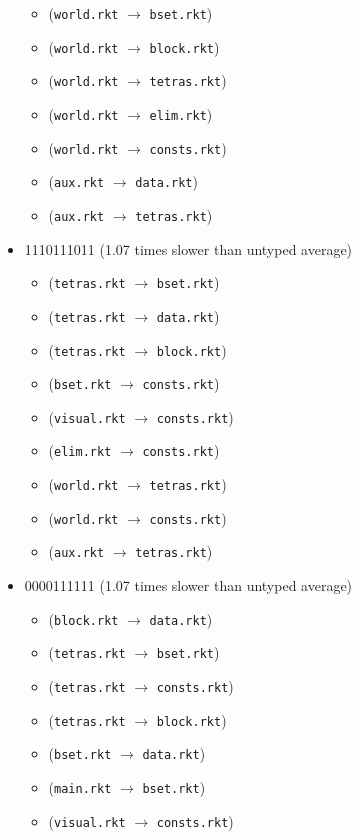\documentclass{article}
\newcommand{\mono}[1]{\texttt{#1}}
\begin{document}
\begin{itemize}
\begin{itemize}
  \item (\mono{world.rkt} $\rightarrow$ \mono{bset.rkt})
  \item (\mono{world.rkt} $\rightarrow$ \mono{block.rkt})
  \item (\mono{world.rkt} $\rightarrow$ \mono{tetras.rkt})
  \item (\mono{world.rkt} $\rightarrow$ \mono{elim.rkt})
  \item (\mono{world.rkt} $\rightarrow$ \mono{consts.rkt})
  \item (\mono{aux.rkt} $\rightarrow$ \mono{data.rkt})
  \item (\mono{aux.rkt} $\rightarrow$ \mono{tetras.rkt})
  \end{itemize}
\item 1110111011 (1.07 times slower than untyped average)
  \begin{itemize}
  \item (\mono{tetras.rkt} $\rightarrow$ \mono{bset.rkt})
  \item (\mono{tetras.rkt} $\rightarrow$ \mono{data.rkt})
  \item (\mono{tetras.rkt} $\rightarrow$ \mono{block.rkt})
  \item (\mono{bset.rkt} $\rightarrow$ \mono{consts.rkt})
  \item (\mono{visual.rkt} $\rightarrow$ \mono{consts.rkt})
  \item (\mono{elim.rkt} $\rightarrow$ \mono{consts.rkt})
  \item (\mono{world.rkt} $\rightarrow$ \mono{tetras.rkt})
  \item (\mono{world.rkt} $\rightarrow$ \mono{consts.rkt})
  \item (\mono{aux.rkt} $\rightarrow$ \mono{tetras.rkt})
  \end{itemize}
\item 0000111111 (1.07 times slower than untyped average)
  \begin{itemize}
  \item (\mono{block.rkt} $\rightarrow$ \mono{data.rkt})
  \item (\mono{tetras.rkt} $\rightarrow$ \mono{bset.rkt})
  \item (\mono{tetras.rkt} $\rightarrow$ \mono{consts.rkt})
  \item (\mono{tetras.rkt} $\rightarrow$ \mono{block.rkt})
  \item (\mono{bset.rkt} $\rightarrow$ \mono{data.rkt})
  \item (\mono{main.rkt} $\rightarrow$ \mono{bset.rkt})
  \item (\mono{visual.rkt} $\rightarrow$ \mono{consts.rkt})

\end{itemize}
\end{itemize}
\end{document}
